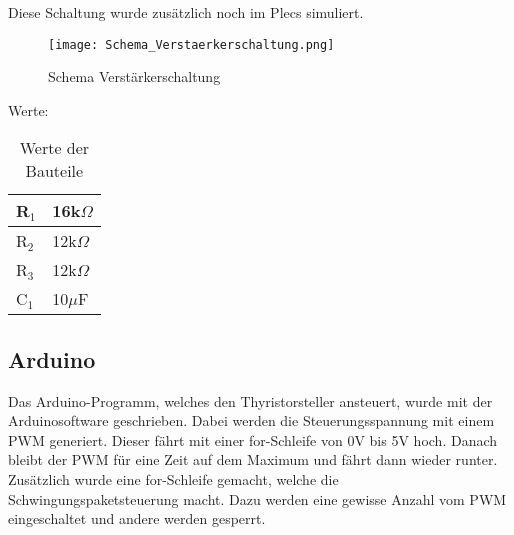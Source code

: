 Diese Schaltung wurde zusätzlich noch im Plecs simuliert.


\newpage
\begin{figure}[ht!]
	\centering
	\texttt{[image: Schema\_Verstaerkerschaltung.png]}	
	\caption{Schema Verstärkerschaltung}\label{fig:Verstaerkerschaltung}
\end{figure}

Werte:
\begin{table}[ht!]
	\centering
	\begin{tabular}{|l|l|}
		\hline
		R$_1$ & 16k$\Omega$ \\ \hline
		R$_2$ & 12k$\Omega$ \\ \hline
		R$_3$ & 12k$\Omega$ \\	\hline
		C$_1$ & 10$\mu$F 	\\	\hline
	\end{tabular}
	\caption{Werte der Bauteile}
	\label{tab:Verstaerkerschaltung}
\end{table}


\subsection{Arduino}
Das Arduino-Programm, welches den Thyristorsteller ansteuert, wurde mit der Arduinosoftware geschrieben. Dabei werden die Steuerungsspannung mit einem PWM generiert. Dieser fährt mit einer for-Schleife von 0V bis 5V hoch. Danach bleibt der PWM für eine Zeit auf dem Maximum und fährt dann wieder runter. Zusätzlich wurde eine for-Schleife gemacht, welche die Schwingungspaketsteuerung macht. Dazu werden eine gewisse Anzahl vom PWM eingeschaltet und andere werden gesperrt. 







